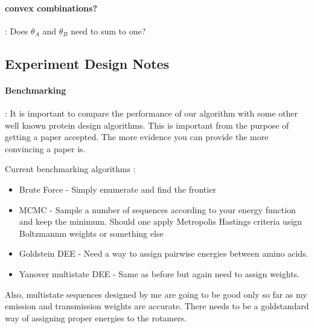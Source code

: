 \documentclass{article}
\begin{document}
\paragraph{convex combinations?} : Does $\theta_A$ and $\theta_B$ need to sum to one?

\subsection{Experiment Design Notes}

\paragraph{Benchmarking} : It is important to compare the performance of our algorithm with some other well known protein design algorithms. This is important from the purpose of getting a paper accepted. The more evidence you can provide the more convincing a paper is. 

Current benchmarking algorithms  : 
\begin{itemize}
\item Brute Force - Simply enumerate and find the frontier
\item MCMC - Sample a number of sequences according to your energy function and keep the minimum. Should one apply Metropolis Hastings criteria usign Boltzmannm weights or something else
\item Goldstein DEE - Need a way to assign pairwise energies between amino acids. 
\item Yanover multistate DEE - Same as before but again need to assign weights. 
\end{itemize}

Also, multistate sequences designed by me are going to be good only so far as my emission and transmission weights are accurate. There needs to be a goldstandard way of assigning proper energies to the rotamers. 
\end{document}
